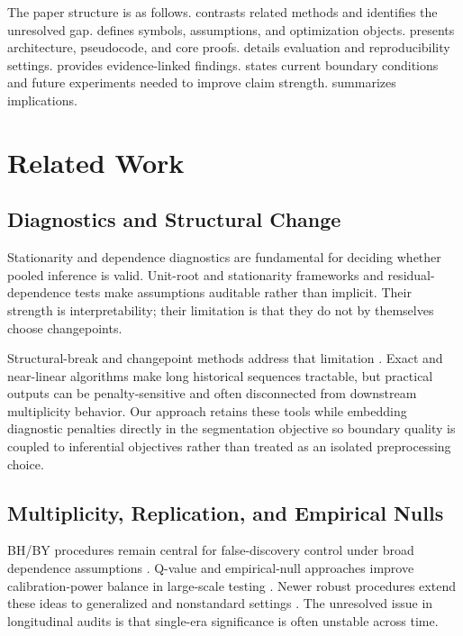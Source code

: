 \documentclass{article} %
\begin{document}
The paper structure is as follows.  contrasts related methods and identifies the unresolved gap.  defines symbols, assumptions, and optimization objects.  presents architecture, pseudocode, and core proofs.  details evaluation and reproducibility settings.  provides evidence-linked findings.  states current boundary conditions and future experiments needed to improve claim strength.  summarizes implications.

\section{Related Work}\label{sec:related}
\subsection{Diagnostics and Structural Change}
Stationarity and dependence diagnostics are fundamental for deciding whether pooled inference is valid. Unit-root and stationarity frameworks \citep{S01,S02,S03,S04} and residual-dependence tests \citep{S05,S06,S07} make assumptions auditable rather than implicit. Their strength is interpretability; their limitation is that they do not by themselves choose changepoints.

Structural-break and changepoint methods address that limitation \citep{S10,S11,S12,S13,S14,S27,S28,S37}. Exact and near-linear algorithms make long historical sequences tractable, but practical outputs can be penalty-sensitive and often disconnected from downstream multiplicity behavior. Our approach retains these tools while embedding diagnostic penalties directly in the segmentation objective so boundary quality is coupled to inferential objectives rather than treated as an isolated preprocessing choice.

\subsection{Multiplicity, Replication, and Empirical Nulls}
BH/BY procedures remain central for false-discovery control under broad dependence assumptions \citep{S15,S16}. Q-value and empirical-null approaches improve calibration-power balance in large-scale testing \citep{S17,S18,S19}. Newer robust procedures extend these ideas to generalized and nonstandard settings \citep{S25,S26}. The unresolved issue in longitudinal audits is that single-era significance is often unstable across time.
\end{document}
